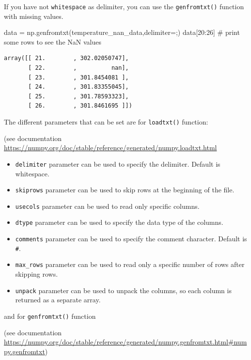 \documentclass[
  letterpaper,
  DIV=11,
  numbers=noendperiod]{scrreprt}
\newenvironment{Shaded}{\begin{snugshade}}{\end{snugshade}}
\newcommand{\CommentTok}[1]{\textcolor[rgb]{0.37,0.37,0.37}{#1}}
\newcommand{\DecValTok}[1]{\textcolor[rgb]{0.68,0.00,0.00}{#1}}
\newcommand{\NormalTok}[1]{\textcolor[rgb]{0.00,0.23,0.31}{#1}}
\newcommand{\OperatorTok}[1]{\textcolor[rgb]{0.37,0.37,0.37}{#1}}
\newcommand{\StringTok}[1]{\textcolor[rgb]{0.13,0.47,0.30}{#1}}
\begin{document}
If you have not \texttt{whitespace} as delimiter, you can use the
\texttt{genfromtxt()} function with missing values.

\begin{Shaded}
\begin{Highlighting}[]
\NormalTok{data }\OperatorTok{=}\NormalTok{ np.genfromtxt(temperature\_nan\_data,delimiter}\OperatorTok{=}\StringTok{\textquotesingle{};\textquotesingle{}}\NormalTok{)}
\NormalTok{data[}\DecValTok{20}\NormalTok{:}\DecValTok{26}\NormalTok{] }\CommentTok{\# print some rows to see the NaN values}
\end{Highlighting}
\end{Shaded}

\begin{verbatim}
array([[ 21.        , 302.02050747],
       [ 22.        ,          nan],
       [ 23.        , 301.8454081 ],
       [ 24.        , 301.83355045],
       [ 25.        , 301.78593323],
       [ 26.        , 301.8461695 ]])
\end{verbatim}

The different parameters that can be set are for \texttt{loadtxt()}
function:

(see documentation
\url{https://numpy.org/doc/stable/reference/generated/numpy.loadtxt.html}

\begin{itemize}
\item
  \texttt{delimiter} parameter can be used to specify the delimiter.
  Default is whitespace.
\item
  \texttt{skiprows} parameter can be used to skip rows at the beginning
  of the file.
\item
  \texttt{usecols} parameter can be used to read only specific columns.
\item
  \texttt{dtype} parameter can be used to specify the data type of the
  columns.
\item
  \texttt{comments} parameter can be used to specify the comment
  character. Default is \texttt{\#}.
\item
  \texttt{max\_rows} parameter can be used to read only a specific
  number of rows after skipping rows.
\item
  \texttt{unpack} parameter can be used to unpack the columns, so each
  column is returned as a separate array.
\end{itemize}

and for \texttt{genfromtxt()} function

(see documentation
\url{https://numpy.org/doc/stable/reference/generated/numpy.genfromtxt.html\#numpy.genfromtxt})
\end{document}

